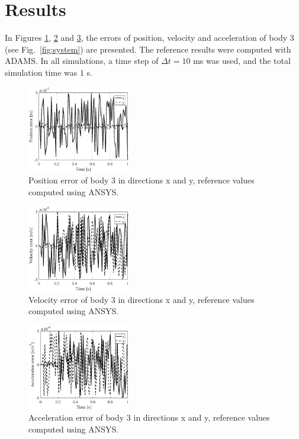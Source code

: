\documentclass{article}
\begin{document}
	\section*{Results}
	In Figures \ref*{fig:pos}, \ref*{fig:vel} and \ref*{fig:acc}, the errors of position, velocity and acceleration of body 3 (see Fig.~\ref{fig:system}) are presented. The reference results were computed with ADAMS. In all simulations, a time step of $ \Delta t = 10$ ms was used, and the total simulation time was $1$ s.
	
	\vspace{-2ex}
	\begin{figure}[htb]
		\centering
		\includegraphics[width=0.4\textwidth]{position.eps}
		\caption{Position error of body 3 in directions x and y, reference values computed using ANSYS.\label{fig:pos}}
	\end{figure}
	\vspace{-2ex}
	\begin{figure}[htb]
		\centering
		\includegraphics[width=0.4\textwidth]{velocity.eps}
		\caption{Velocity error of body 3 in directions x and y, reference values computed using ANSYS.\label{fig:vel}}
	\end{figure}
	\vspace{-2ex}
	\begin{figure}[htb]
		\centering
		\includegraphics[width=0.4\textwidth]{acceleration.eps}
		\caption{Acceleration error of body 3 in directions x and y, reference values computed using ANSYS.\label{fig:acc}}
	\end{figure}
	
\end{document}
